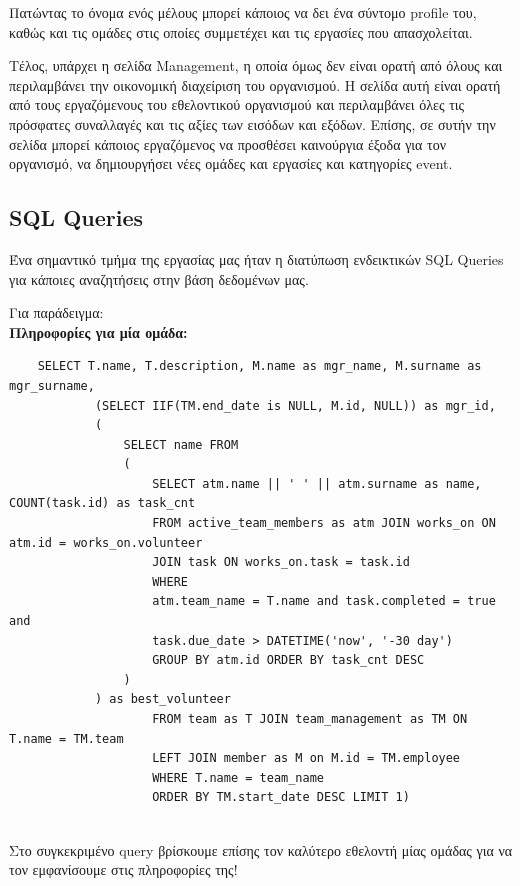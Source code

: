 \documentclass[manuscript,screen,review]{acmart}
\newcommand{\en}[1]{\foreignlanguage{english}{#1}}
\begin{document}
Πατώντας το όνομα ενός μέλους μπορεί κάποιος να δει ένα σύντομο \en{profile}
του, καθώς και τις ομάδες στις οποίες συμμετέχει και τις εργασίες που
απασχολείται.

Τέλος, υπάρχει η σελίδα \en{Management}, η οποία όμως δεν είναι ορατή από όλους
και περιλαμβάνει την οικονομική διαχείριση του οργανισμού. Η σελίδα αυτή είναι
ορατή από τους εργαζόμενους του εθελοντικού οργανισμού και περιλαμβάνει όλες
τις πρόσφατες συναλλαγές και τις αξίες των εισόδων και εξόδων. Επίσης, σε συτήν
την σελίδα μπορεί κάποιος εργαζόμενος να προσθέσει καινούργια έξοδα για τον
οργανισμό, να δημιουργήσει νέες ομάδες και εργασίες και κατηγορίες \en{event}. 

\subsection{\en{SQL Queries}}
Ένα σημαντικό τμήμα της εργασίας μας ήταν η διατύπωση ενδεικτικών \en{SQL Queries} για κάποιες αναζητήσεις στην βάση δεδομένων μας.

Για παράδειγμα:\\
\textbf{Πληροφορίες για μία ομάδα:}
    \begin{lstlisting}
    SELECT T.name, T.description, M.name as mgr_name, M.surname as mgr_surname, 
            (SELECT IIF(TM.end_date is NULL, M.id, NULL)) as mgr_id, 
            (
                SELECT name FROM 
                (
                    SELECT atm.name || ' ' || atm.surname as name, COUNT(task.id) as task_cnt 
                    FROM active_team_members as atm JOIN works_on ON atm.id = works_on.volunteer 
                    JOIN task ON works_on.task = task.id
                    WHERE 
                    atm.team_name = T.name and task.completed = true and
                    task.due_date > DATETIME('now', '-30 day')
                    GROUP BY atm.id ORDER BY task_cnt DESC
                )
            ) as best_volunteer
                    FROM team as T JOIN team_management as TM ON T.name = TM.team
                    LEFT JOIN member as M on M.id = TM.employee
                    WHERE T.name = team_name
                    ORDER BY TM.start_date DESC LIMIT 1)
    
    \end{lstlisting}
        
Στο συγκεκριμένο \en{query} βρίσκουμε επίσης τον καλύτερο εθελοντή μίας ομάδας για να τον εμφανίσουμε στις πληροφορίες της!\\
\end{document}
